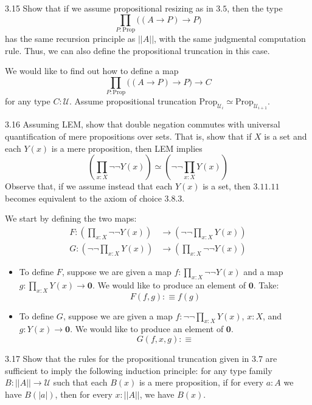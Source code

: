 \documentclass[14pt]{extarticle}
\newcommand{\0}{{\mathbf 0}}
\newcommand{\1}{{\mathbf 1}}
\newcommand{\2}{{\mathbf 2}}
\newcommand{\UU}{{\mathcal U}}
\newcommand{\Prop}{\mathrm{Prop}}
\begin{document}
\begin{prob}{3.15}{}
Show that if we assume propositional resizing as in $3.5$, then the type \[\prod_{P : \Prop} \Big((A \to P) \to P \Big)\] has the same recursion principle as $||A||$, with the same judgmental computation rule. Thus, we can also define the propositional truncation in this case.
\end{prob}
We would like to find out how to define a map 
\[\prod_{P : \Prop} \Big((A \to P) \to P \Big) \to C\] for any type $C : \UU$. Assume propositional truncation $\Prop_{\UU_i} \simeq \Prop_{\UU_{i+1}}$.

\begin{prob}{3.16}{}
Assuming LEM, show that double negation commutes with universal quantification of mere propositions over sets. That is, show that if $X$ is a set and each $Y(x)$ is a mere proposition, then LEM implies
\[\left(\prod_{x:X} \neg \neg Y(x)\right) \simeq \left(\neg \neg \prod_{x:X} Y(x)\right)\]
Observe that, if we assume instead that each $Y(x)$ is a set, then $3.11.11$ becomes equivalent to the axiom of choice $3.8.3$.
\end{prob}
We start by defining the two maps:
\begin{align*}
F : \left(\prod_{x:X} \neg \neg Y(x)\right) &\to \left(\neg \neg \prod_{x:X} Y(x)\right)  \\
G :  \left(\neg \neg \prod_{x:X} Y(x)\right) &\to \left(\prod_{x:X} \neg \neg Y(x)\right)
\end{align*}

\begin{itemize}
\item To define $F$, suppose we are given a map $f : \prod_{x:X} \neg \neg Y(x)$ and a map $g : \prod_{x:X} Y(x) \to \0$. We would like to produce an element of $\0$. Take:
\[F(f,g):\equiv f(g)\]
\item To define $G$, suppose we are given a map $f : \neg \neg \prod_{x:X} Y(x)$, $x : X$, and $g: Y(x) \to \0$. We would like to produce an element of $\0$.
\[G(f,x,g) : \equiv \]
\end{itemize}

\begin{prob}{3.17}{}
Show that the rules for the propositional truncation given in $3.7$ are sufficient to imply the following induction principle: for any type family $B : ||A|| \to \UU$ such that each $B(x)$ is a mere proposition, if for every $a:A$ we have $B(|a|)$, then for every $x : ||A||$, we have $B(x)$.
\end{prob}
\end{document}

